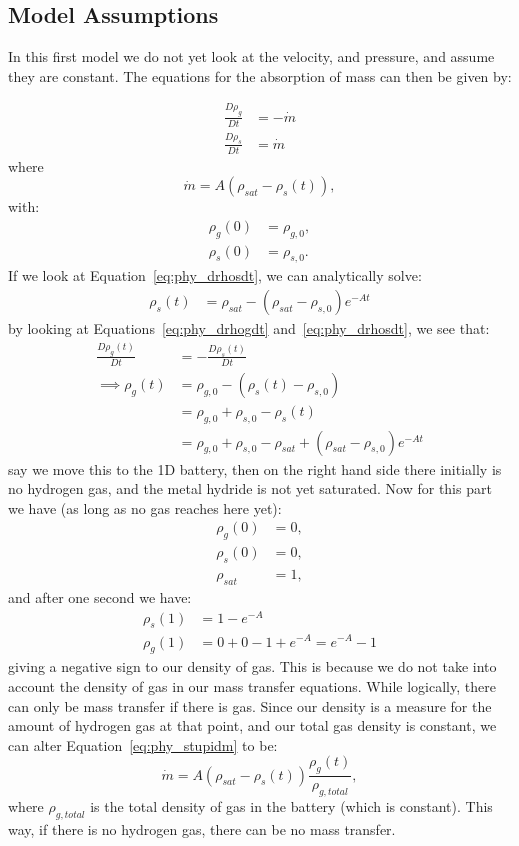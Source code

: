 \clearpage

\subsection*{Model Assumptions}

In this first model we do not yet look at the velocity, and pressure, and assume they are constant. The equations for the absorption of mass can then be given by:

\begin{align}
        \frac{D\rho_g}{Dt} &= -\dot{m}\label{eq:phy_drhogdt} \\
        \frac{D\rho_s}{Dt} &= \dot{m}\label{eq:phy_drhosdt}
\end{align}
where
\begin{equation}\label{eq:phy_stupidm}
    \dot{m} = A(\rho_{sat} - \rho_s(t)),
\end{equation}
with:
\begin{align}
    \rho_g(0) &= \rho_{g,0}, \\
    \rho_s(0) &= \rho_{s,0}.
\end{align}
If we look at Equation~\ref{eq:phy_drhosdt}, we can analytically solve:
\begin{align}
    \rho_s(t) &= \rho_{sat} - (\rho_{sat} - \rho_{s,0}) e^{-At} 
\end{align}
by looking at Equations~\ref{eq:phy_drhogdt} and~\ref{eq:phy_drhosdt}, we see that:
\begin{align}
    \frac{D\rho_g(t)}{Dt} &= -\frac{D\rho_s(t)}{Dt} \\
    \implies \rho_g(t) &= \rho_{g,0} - (\rho_s(t) - \rho_{s,0}) \\
    & = \rho_{g,0} + \rho_{s,0} - \rho_s(t) \\
    & = \rho_{g,0} + \rho_{s,0} - \rho_{sat} + (\rho_{sat} - \rho_{s,0}) e^{-At} 
\end{align}
say we move this to the 1D battery, then on the right hand side there initially is no hydrogen gas, and the metal hydride is not yet saturated. Now for this part we have (as long as no gas reaches here yet):
\begin{align}
    \rho_g(0) & = 0, \\
    \rho_s(0) & = 0, \\
    \rho_{sat} & = 1,
\end{align}
and after one second we have:
\begin{align}
    \rho_s(1) &= 1 - e^{-A} \\
    \rho_g(1) &= 0 + 0 - 1 + e^{-A} = e^{-A} - 1
\end{align}
giving a negative sign to our density of gas. This is because we do not take into account the density of gas in our mass transfer equations. While logically, there can only be mass transfer if there is gas. Since our density is a measure for the amount of hydrogen gas at that point, and our total gas density is constant, we can alter Equation~\ref{eq:phy_stupidm} to be:
\begin{equation}
    \dot{m} = A(\rho_{sat} - \rho_s(t))\frac{\rho_g(t)}{\rho_{g,total}},
\end{equation}
where $\rho_{g,total}$ is the total density of gas in the battery (which is constant). This way, if there is no hydrogen gas, there can be no mass transfer. 